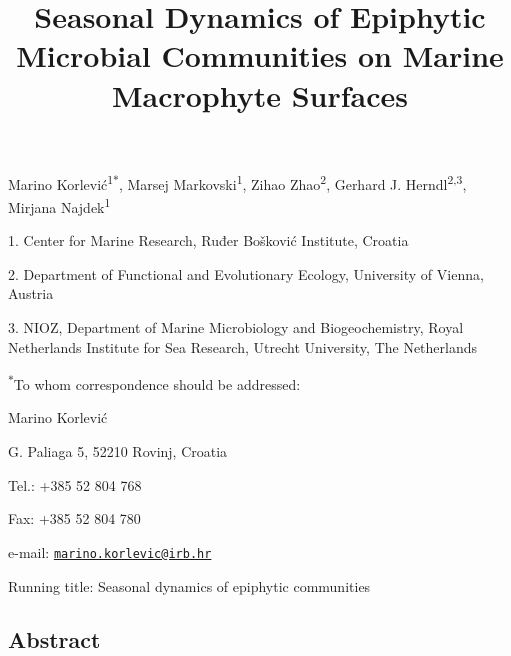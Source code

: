 \documentclass[12pt,]{article}
\title{\textbf{Seasonal Dynamics of Epiphytic Microbial Communities on Marine
Macrophyte Surfaces}}
\author{}
\date{}
\begin{document}
\maketitle

\vspace{20mm}

Marino Korlević\textsuperscript{1\(*\)}, Marsej
Markovski\textsuperscript{1}, Zihao Zhao\textsuperscript{2}, Gerhard J.
Herndl\textsuperscript{2,3}, Mirjana Najdek\textsuperscript{1}

1. Center for Marine Research, Ruđer Bošković Institute, Croatia

2. Department of Functional and Evolutionary Ecology, University of
Vienna, Austria

3. NIOZ, Department of Marine Microbiology and Biogeochemistry, Royal
Netherlands Institute for Sea Research, Utrecht University, The
Netherlands

\textsuperscript{\(*\)}To whom correspondence should be addressed:

Marino Korlević

G. Paliaga 5, 52210 Rovinj, Croatia

Tel.: +385 52 804 768

Fax: +385 52 804 780

e-mail:
\href{mailto:marino.korlevic@irb.hr}{\nolinkurl{marino.korlevic@irb.hr}}

Running title: Seasonal dynamics of epiphytic communities

\newpage
\linenumbers
{}
\setlength\parindent{24pt}
\doublespacing

\hypertarget{abstract}{%
\subsection{Abstract}\label{abstract}}
\end{document}
